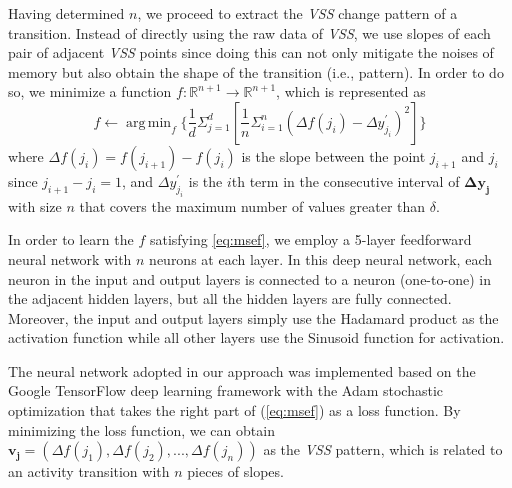 \documentclass[letterpaper,12pt]{article}
\DeclareMathOperator*{\argminA}{arg\,min} %
\begin{document}
Having determined $n$, we proceed to extract the \emph{VSS} change pattern of a transition. Instead of directly using the raw data of \emph{VSS}, we use slopes of each pair of adjacent \emph{VSS} points since doing this can not only mitigate the noises of memory but also obtain the shape of the transition (i.e., pattern). In order to do so, we minimize a function
$f:\mathbb{R}^{n+1}\longrightarrow \mathbb{R}^{n+1}$, which is represented as
%
\begin{equation} \label{eq:msef}
f \leftarrow \argminA_f\{\frac{1}{d}\Sigma^d_{j=1}
[\frac{1}{n}\Sigma^{n}_{i=1}(\Delta f(j_i)-\Delta y^\prime_{j_i})^2]\}
\end{equation}
where $\Delta f(j_i)=f(j_{i+1})-f(j_i)$ 
is the slope between the point $j_{i+1}$ and $j_i$ since $j_{i+1} - j_i=1$, and 
$\Delta y^\prime_{j_i}$ is the $i$th term in the consecutive interval of $\mathbf{\Delta y_j}$ with size $n$ that covers the maximum number of values greater than $\delta$.


In order to learn the $f$ satisfying \eqref{eq:msef}, we employ a 5-layer feedforward neural network with $n$ neurons at each layer. In this deep neural network, each neuron in the input and output layers is connected to a neuron (one-to-one) in the adjacent hidden layers, but all the hidden layers are fully connected. Moreover, the input and output layers simply use the Hadamard product as the activation function while all other layers use the Sinusoid function for activation. 

The neural network adopted in our approach was implemented based on the Google TensorFlow \cite{abadi2016tensorflow} deep learning framework with the Adam stochastic optimization \cite{kingma2014adam} that takes the right part of (\ref{eq:msef}) as a loss function. By minimizing the loss function, we can obtain $\mathbf{v_j}=( \Delta f(j_1),\Delta f(j_2),...,\Delta f(j_{n}))$ as the \emph{VSS} pattern, which is related to an activity transition with $n$ pieces of slopes. 
\end{document}
